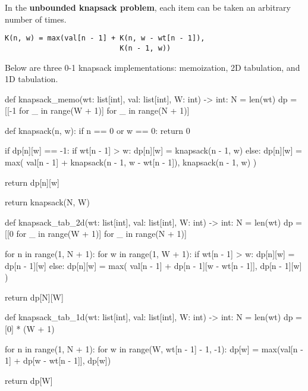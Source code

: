 \documentclass[12pt, titlepage]{article}
\begin{document}
In the \textbf{unbounded knapsack problem}, each item can be taken an arbitrary number of times. \medskip
\begin{center}
\begin{varwidth}{\linewidth}
\begin{verbatim}
K(n, w) = max(val[n - 1] + K(n, w - wt[n - 1]),
                           K(n - 1, w))
\end{verbatim}
\end{varwidth}
\end{center}

Below are three 0-1 knapsack implementations: memoization, 2D tabulation, and 1D tabulation. \medskip

\begin{python}
def knapsack_memo(wt: list[int], val: list[int], W: int) -> int:
    N = len(wt)
    dp = [[-1 for _ in range(W + 1)] for _ in range(N + 1)]

    def knapsack(n, w):
        if n == 0 or w == 0:
            return 0

        if dp[n][w] == -1:
            if wt[n - 1] > w:
                dp[n][w] = knapsack(n - 1, w)
            else:
                dp[n][w] = max(
                    val[n - 1] + knapsack(n - 1, w - wt[n - 1]),
                    knapsack(n - 1, w)
                )

        return dp[n][w]

    return knapsack(N, W)
\end{python}

\begin{python}
def knapsack_tab_2d(wt: list[int], val: list[int], W: int) -> int:
    N = len(wt)
    dp = [[0 for _ in range(W + 1)] for _ in range(N + 1)]

    for n in range(1, N + 1):
        for w in range(1, W + 1):
            if wt[n - 1] > w:
                dp[n][w] = dp[n - 1][w]
            else:
                dp[n][w] = max(
                    val[n - 1] + dp[n - 1][w - wt[n - 1]],
                    dp[n - 1][w]
                )

    return dp[N][W]
\end{python}

\begin{python}
def knapsack_tab_1d(wt: list[int], val: list[int], W: int) -> int:
    N = len(wt)
    dp = [0] * (W + 1)

    for n in range(1, N + 1):
        for w in range(W, wt[n - 1] - 1, -1):
            dp[w] = max(val[n - 1] + dp[w - wt[n - 1]], dp[w])

    return dp[W]
\end{python}
\end{document}
